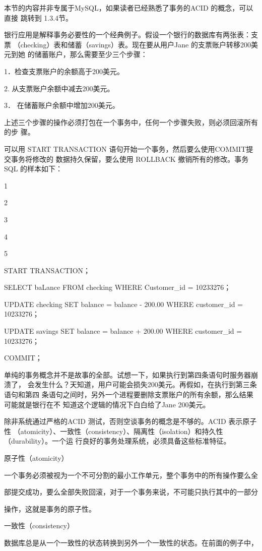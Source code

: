 本节的内容并非专属于MySQL，如果读者已经熟悉了事务的ACID 的概念，可以直接
跳转到 1.3.4节。

银行应用是解释事务必要性的一个经典例子。假设一个银行的数据库有两张表：支票
（checking）表和储蓄（savings）表。现在要从用户Jane 的支票账户转移200美元到她
的储蓄账户，那么需要至少三个步骤：

1．检查支票账户的余额高于200美元。

2. 从支票账户余额中减去200美元。

3． 在储蓄账户余额中增加200美元。

上述三个步骤的操作必须打包在一个事务中，任何一个步骤失败，则必须回滚所有的步
骤。

可以用 START TRANSACTION 语句开始一个事务，然后要么使用COMMIT提交事务将修改的
数据持久保留，要么使用 ROLLBACK 撤销所有的修改。事务 SQL 的样本如下：

1

2

3

4

5

START TRANSACTION；

SELECT baLance FROM checking WHERE Customer\_id = 10233276；

UPDATE checking SET balance = balance - 200.00 WHERE customer\_id = 10233276；

UPDATE savings SET balance = balance + 200.00 WHERE customer\_id = 10233276；

COMMIT；

单纯的事务概念并不是故事的全部。试想一下，如果执行到第四条语句时服务器崩溃了，
会发生什么？天知道，用户可能会损失200美元。再假如，在执行到第三条语句和第四
条语句之间时，另外一个进程要删除支票账户的所有余额，那么结果可能就是银行在不
知道这个逻辑的情况下白白给了Jane 200美元。

除非系统通过严格的ACID 测试，否则空谈事务的概念是不够的。ACID 表示原子性
（atomicity）、一致性（consistency）、隔离性（isolation）和持久性（durability）。一个运
行良好的事务处理系统，必须具备这些标准特征。

原子性（atomicity）

一个事务必须被视为一个不可分割的最小工作单元，整个事务中的所有操作要么全

部提交成功，要么全部失败回滚，对于一个事务来说，不可能只执行其中的一部分

操作，这就是事务的原子性。

一致性（consistency）

数据库总是从一个一致性的状态转换到另外一个一致性的状态。在前面的例子中，

